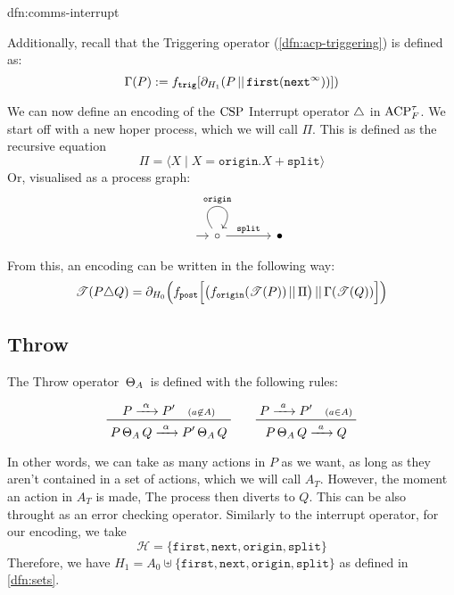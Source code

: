 \documentclass[../hons_project.tex]{subfiles}
\begin{document}
\begin{dfn}{dfn:comms-interrupt}{}
	\longrule{0.08ex}

	Additionally, recall that the Triggering operator (\ref{dfn:acp-triggering}) is defined as:
	\[\Gamma(P) := f_{\mathtt{trig}}[\partial_{H_{1}}(P \merge \mathtt{first}(\mathtt{next}^{\infty}))])\]
\end{dfn}

We can now define an encoding of the $\csp$ Interrupt operator $\interrupt$ in $\acptf$. We start off with a new hoper process, which we will call $\Pi$. This is defined as the recursive equation
\[\Pi = \langle X \mid X = \mathtt{origin}.X + \mathtt{split} \rangle\]
Or, visualised as a process graph:
\[\begin{tikzcd}[column sep=scriptsize, row sep=scriptsize]
		{} & \circ && \bullet
		\arrow[shorten <=8pt, from=1-1, to=1-2]
		\arrow["{\mathtt{origin}}", from=1-2, to=1-2, loop, in=55, out=125, distance=10mm]
		\arrow["{\mathtt{split}}", from=1-2, to=1-4]
	\end{tikzcd}\]

From this, an encoding can be written in the following way:
\[\trans{P \interrupt Q} = \partial_{H_{0}}\Bigl(f_{\mathtt{post}}\Bigl[ \bigl(f_{\mathtt{origin}}(\trans{P}) \merge \Pi\bigr) \merge \Gamma(\trans{Q}) \Bigr]\Bigr)\]
\subsection{Throw}\label{ssec:throw}

The Throw operator $\throw$ is defined with the following rules:

\[\prftree{P \prightarrow{\alpha} P' \quad \scriptstyle(a\not\in A)}{P \throw Q \prightarrow{\alpha} P' \throw Q} \qquad \prftree{P \prightarrow{a} P' \quad \scriptstyle(a\in A)}{P \throw Q \prightarrow{a} Q }\]

In other words, we can take as many actions in $P$ as we want, as long as they aren't contained in a set of actions, which we will call $A_{T}$. However, the moment an action in $A_{T}$ is made, The process then diverts to $Q$. This can be also throught as an error checking operator. Similarly to the interrupt operator, for our encoding, we take
\[\mathscr{H} = \{\mathtt{first}, \mathtt{next}, \mathtt{origin}, \mathtt{split}\}\]
Therefore, we have $H_{1} = A_{0} \uplus \{\mathtt{first}, \mathtt{next}, \mathtt{origin}, \mathtt{split}\}$ as defined in \ref{dfn:sets}.
\end{document}
